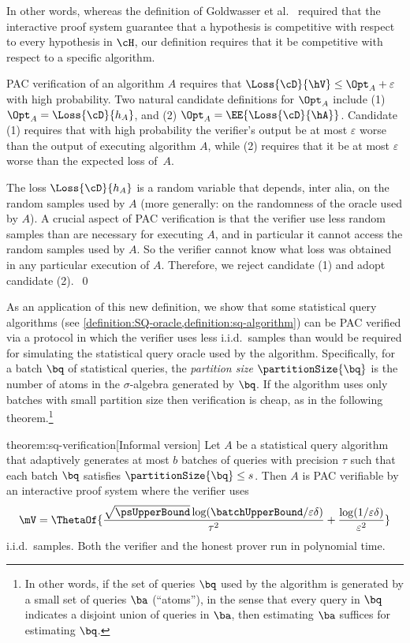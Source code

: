 In other words, whereas the definition of Goldwasser et al.\ \cite{GoldwasserRSY21} required that the interactive proof system guarantee that a hypothesis is competitive with respect to every hypothesis in $\cH$, our definition requires that it be competitive with respect to a specific algorithm.  

\begin{remark}
	PAC verification of an algorithm $A$ requires that $\Loss{\cD}{\hV} \leq \Opt_A + \varepsilon$ with high probability. Two natural candidate definitions for $\Opt_A$ include (1) $\Opt_A = \Loss{\cD}{h_A}$, and (2) $\Opt_A = \EE{\Loss{\cD}{\hA}}$. Candidate (1) requires that with high probability the verifier's output be at most $\varepsilon$ worse than the output of executing algorithm $A$, while (2) requires that it be at most $\varepsilon$ worse than the expected loss of~$A$.

	The loss $\Loss{\cD}{h_A}$ is a random variable that depends, inter alia, on the random samples used by $A$ (more generally: on the randomness of the oracle used by $A$). A crucial aspect of PAC verification is that the verifier use less random samples than are necessary for executing $A$, and in particular it cannot access the random samples used by $A$. So the verifier cannot know what loss was obtained in any particular execution of $A$. Therefore, we reject candidate (1) and adopt candidate (2).~\qed
\end{remark}

As an application of this new definition, we show that some statistical query algorithms (see \cref{definition:SQ-oracle,definition:sq-algorithm}) can be PAC verified via a protocol in which the verifier uses less i.i.d.\ samples than would be required for simulating the statistical query oracle used by the algorithm. Specifically, for a batch $\bq$ of statistical queries, the \emph{partition size} $\partitionSize{\bq}$ is the number of atoms in the $\sigma$-algebra generated by $\bq$. If the algorithm uses only batches with small partition size then verification is cheap, as in the following theorem.\footnote{%
	In other words, if the set of queries $\bq$ used by the algorithm is generated by a small set of queries $\ba$ (``atoms''), in the sense that every query in $\bq$ indicates a disjoint union of queries in $\ba$, then estimating $\ba$ suffices for estimating $\bq$.
}

\begin{reptheorem}{theorem:sq-verification}[Informal version]
	Let $A$ be a statistical query algorithm that adaptively generates at most $b$ batches of queries with precision $\tau$ such that each batch $\bq$ satisfies $\partitionSize{\bq} \leq s$.	Then $A$ is PAC verifiable by an interactive proof system where the verifier uses
	\[
		\mV = \ThetaOf{\frac{\sqrt{\psUpperBound}\log(\batchUpperBound/\varepsilon\delta)}{\tau^2} + \frac{\log(1/\varepsilon\delta)}{\varepsilon^2}}
	\]
	i.i.d.\ samples. Both the verifier and the honest prover run in polynomial time.
\end{reptheorem}

